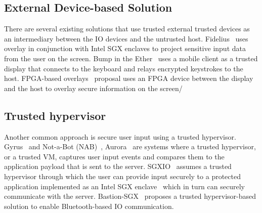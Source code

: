 \subsection{External Device-based Solution} There are several existing solutions that use trusted external trusted devices as an intermediary between the IO devices and the untrusted host. Fidelius~\cite{Fidelius} uses overlay in conjunction with Intel SGX enclaves to project sensitive input data from the user on the screen. Bump in the Ether~\cite{McCPerRei2006} uses a mobile client as a trusted display that connects to the keyboard and relays encrypted keystrokes to the host. FPGA-based overlays~\cite{fpga_overlay} proposal uses an FPGA device between the display and the host to overlay secure information on the screen/ 


\subsection{Trusted hypervisor} Another common approach is secure user input using a trusted hypervisor. Gyrus~\cite{gyrus} and Not-a-Bot (NAB)~\cite{nab}, Aurora~\cite{liang2019establishing} are systems where a trusted hypervisor, or a trusted VM, captures user input events and compares them to the application payload that is sent to the server. SGXIO~\cite{sgxio} assumes a trusted hypervisor through which the user can provide input securely to a protected application implemented as an Intel SGX enclave~\cite{sgx} which in turn can securely communicate with the server. Bastion-SGX~\cite{BASTION-SGX} proposes a trusted hypervisor-based solution to enable Bluetooth-based IO communication.

